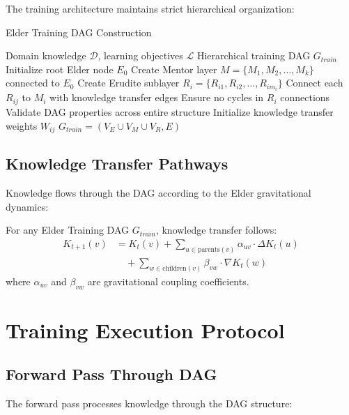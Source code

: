 The training architecture maintains strict hierarchical organization:

\begin{algorithm}[H]
\caption{Elder Training DAG Construction}
\begin{algorithmic}[1]
\REQUIRE Domain knowledge $\mathcal{D}$, learning objectives $\mathcal{L}$
\ENSURE Hierarchical training DAG $G_{train}$
\STATE Initialize root Elder node $E_0$
\STATE Create Mentor layer $M = \{M_1, M_2, \ldots, M_k\}$ connected to $E_0$
    \STATE Create Erudite sublayer $R_i = \{R_{i1}, R_{i2}, \ldots, R_{im_i}\}$
    \STATE Connect each $R_{ij}$ to $M_i$ with knowledge transfer edges
    \STATE Ensure no cycles in $R_i$ connections
\ENDFOR
\STATE Validate DAG properties across entire structure
\STATE Initialize knowledge transfer weights $W_{ij}$
\RETURN $G_{train} = (V_E \cup V_M \cup V_R, E)$
\end{algorithmic}
\end{algorithm}

\subsection{Knowledge Transfer Pathways}

Knowledge flows through the DAG according to the Elder gravitational dynamics:

\begin{theorem}
For any Elder Training DAG $G_{train}$, knowledge transfer follows:
\begin{align}
K_{t+1}(v) &= K_t(v) + \sum_{u \in \text{parents}(v)} \alpha_{uv} \cdot \Delta K_t(u) \\
&\quad + \sum_{w \in \text{children}(v)} \beta_{vw} \cdot \nabla K_t(w)
\end{align}
where $\alpha_{uv}$ and $\beta_{vw}$ are gravitational coupling coefficients.
\end{theorem}

\section{Training Execution Protocol}

\subsection{Forward Pass Through DAG}

The forward pass processes knowledge through the DAG structure:


